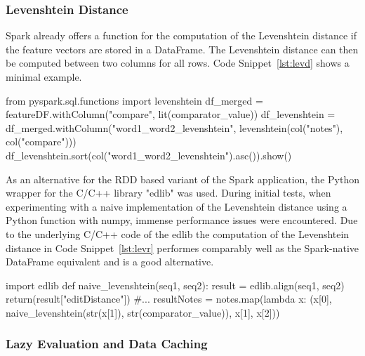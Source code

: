 \subsubsection{Levenshtein Distance}

Spark already offers a function for the computation of the Levenshtein distance if the feature vectors are stored in a DataFrame. The Levenshtein distance can then be computed between two columns for all rows. Code Snippet~\ref{lst:levd} shows a minimal example. 

\begin{pythonCode}[frame=single,label={lst:levd},caption={Levenshtein DataFrame},captionpos=b]
from pyspark.sql.functions import levenshtein 
df_merged = featureDF.withColumn("compare", lit(comparator_value)) 
df_levenshtein = df_merged.withColumn("word1_word2_levenshtein", levenshtein(col("notes"), col("compare")))
df_levenshtein.sort(col("word1_word2_levenshtein").asc()).show()
\end{pythonCode}

\noindent As an alternative for the RDD based variant of the Spark application, the Python wrapper for the C/C++ library "edlib" was used. During initial tests, when experimenting with a naive implementation of the Levenshtein distance using a Python function with numpy, immense performance issues were encountered. Due to the underlying C/C++ code of the edlib the computation of the Levenshtein distance in Code Snippet~\ref{lst:levr} performes comparably well as the Spark-native DataFrame equivalent and is a good alternative. 

\begin{pythonCode}[frame=single,label={lst:levr},caption={Levenshtein RDD},captionpos=b]
import edlib
def naive_levenshtein(seq1, seq2):
    result = edlib.align(seq1, seq2)
    return(result["editDistance"])
#...
resultNotes = notes.map(lambda x: (x[0], naive_levenshtein(str(x[1]), str(comparator_value)), x[1], x[2]))
\end{pythonCode}

\subsubsection{Lazy Evaluation and Data Caching}\label{leval}

